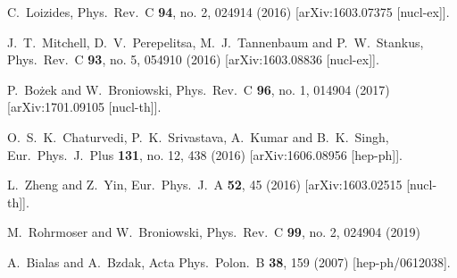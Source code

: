 \documentclass[a4paper,12pt]{article}
\begin{document}
\begin{thebibliography}{9}
 C.~Loizides,
  Phys.\ Rev.\ C {\bf 94}, no. 2, 024914 (2016)
  [arXiv:1603.07375 [nucl-ex]].

 J.~T.~Mitchell, D.~V.~Perepelitsa, M.~J.~Tannenbaum and P.~W.~Stankus,
  Phys.\ Rev.\ C {\bf 93}, no. 5, 054910 (2016)
  [arXiv:1603.08836 [nucl-ex]].

 P.~Bożek and W.~Broniowski,
  Phys.\ Rev.\ C {\bf 96}, no. 1, 014904 (2017)
  [arXiv:1701.09105 [nucl-th]].

 O.~S.~K.~Chaturvedi, P.~K.~Srivastava, A.~Kumar and B.~K.~Singh,
  Eur.\ Phys.\ J.\ Plus {\bf 131}, no. 12, 438 (2016)
  [arXiv:1606.08956 [hep-ph]].

 L.~Zheng and Z.~Yin,
  Eur.\ Phys.\ J.\ A {\bf 52}, 45 (2016)
  [arXiv:1603.02515 [nucl-th]].

  M.~Rohrmoser and W.~Broniowski,
  Phys.\ Rev.\ C {\bf 99}, no. 2, 024904 (2019)

  A.~Bialas and A.~Bzdak,
  Acta Phys.\ Polon.\ B {\bf 38}, 159 (2007)
  [hep-ph/0612038].


\end{thebibliography}
\end{document}
